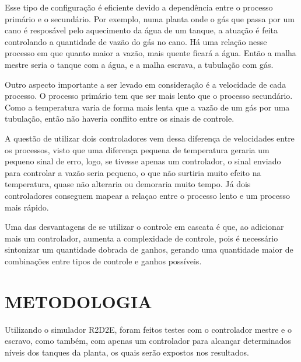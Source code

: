 \documentclass[a4paper,12pt]{article}
\begin{document}
Esse tipo de configuração é eficiente devido a dependência entre o processo primário e o secundário. Por exemplo, numa planta onde o gás que passa por um cano é resposável pelo aquecimento da água de um tanque, a atuação é feita controlando a quantidade de vazão do gás no cano. Há uma relação nesse processo em que quanto maior a vazão, mais quente ficará a água. Então a malha mestre seria o tanque com a água, e a malha escrava, a tubulação com gás. 

Outro aspecto importante a ser levado em consideração é a velocidade de cada processo. O processo primário tem que ser mais lento que o processo secundário. Como a temperatura varia de forma mais lenta que a vazão de um gás por uma tubulação, então não haveria conflito entre os sinais de controle. 

A questão de utilizar dois controladores vem dessa diferença de velocidades entre os processos, visto que uma diferença pequena de temperatura geraria um pequeno sinal de erro, logo, se tivesse apenas um controlador, o sinal enviado para controlar a vazão seria pequeno, o que não surtiria muito efeito na temperatura, quase não alteraria ou demoraria muito tempo. Já dois controladores conseguem mapear a relaçao entre o processo lento e um processo mais rápido. 

Uma das desvantagens de se utilizar o controle em cascata é que, ao adicionar mais um controlador, aumenta a complexidade de controle, pois é necessário sintonizar um quantidade dobrada de ganhos, gerando uma quantidade maior de combinações entre tipos de controle e ganhos possíveis. 




\newpage


\thispagestyle{main}

\section{METODOLOGIA}

\hspace{4ex}Utilizando o simulador R2D2E, foram feitos testes com o controlador mestre e o escravo, como também, com apenas um controlador para alcançar determinados níveis dos tanques da planta, os quais serão expostos nos resultados.
\end{document}
